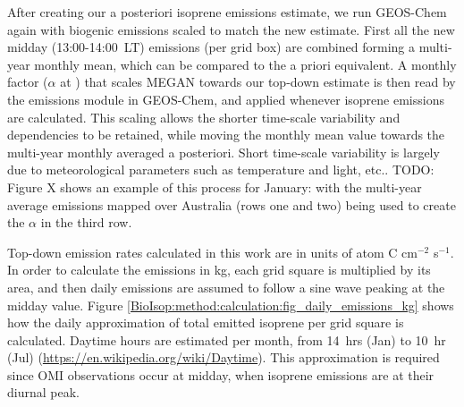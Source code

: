     After creating our a posteriori isoprene emissions estimate, we run GEOS-Chem again with biogenic emissions scaled to match the new estimate. 
    First all the new midday (13:00-14:00~LT) emissions (per grid box) are combined forming a multi-year monthly mean, which can be compared to the a priori equivalent.
    A monthly factor ($\alpha$ at \lowhr) that scales MEGAN towards our top-down estimate is then read by the emissions module in GEOS-Chem, and applied whenever isoprene emissions are calculated.
    This scaling allows the shorter time-scale variability and dependencies to be retained, while moving the monthly mean value towards the multi-year monthly averaged a posteriori.
    Short time-scale variability is largely due to meteorological parameters such as temperature and light, etc..
    TODO: Figure X shows an example of this process for January: with the multi-year average emissions mapped over Australia (rows one and two) being used to create the $\alpha$ in the third row.
    
    Top-down emission rates calculated in this work are in units of atom C cm$^{-2}$ s$^{-1}$.
    In order to calculate the emissions in kg, each grid square is multiplied by its area, and then daily emissions are assumed to follow a sine wave peaking at the midday value.
    Figure \ref{BioIsop:method:calculation:fig_daily_emissions_kg} shows how the daily approximation of total emitted isoprene per grid square is calculated.
    Daytime hours are estimated per month, from 14~hrs (Jan) to 10~hr (Jul) (\url{https://en.wikipedia.org/wiki/Daytime}).
    This approximation is required since OMI observations occur at midday, when isoprene emissions are at their diurnal peak.
    
    
